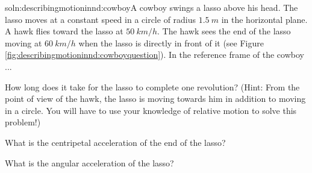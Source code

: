 \begin{problemParts}{soln:describingmotioninnd:cowboy}{\label{prob:describingmotioninnd:cowboy}A cowboy swings a lasso above his head. The lasso moves at a constant speed in a circle of radius $\SI{1.5}{m}$ in the horizontal plane. A hawk flies toward the lasso at $\SI{50}{km/h}$. The hawk sees the end of the lasso moving at $\SI{60}{km/h}$ when the lasso is directly in front of it (see Figure \ref{fig:describingmotioninnd:cowboyquestion}). In the reference frame of the cowboy ...}
\item How long does it take for the lasso to complete one revolution? (Hint: From the point of view of the hawk, the lasso is moving towards him in addition to moving in a circle. You will have to use your knowledge of relative motion to solve this problem!)
\item What is the centripetal acceleration of the end of the lasso? 
\item What is the angular acceleration of the lasso?
\end{problemParts} 

\newpage
